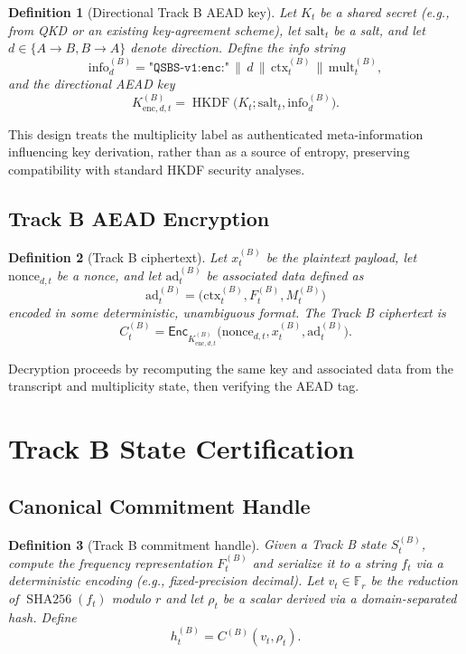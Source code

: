 \documentclass[11pt]{article}
\newtheorem{definition}{Definition}[section]
\newcommand{\F}{\mathbb{F}}
\newcommand{\Enc}{\mathsf{Enc}}
\DeclareMathOperator{\HKDF}{HKDF}
\DeclareMathOperator{\SHA}{SHA256}
\begin{document}
\begin{definition}[Directional Track B AEAD key]
Let \(K_t\) be a shared secret (e.g., from QKD or an existing key-agreement scheme),
let \(\mathrm{salt}_t\) be a salt, and let \(d \in \{A\to B, B\to A\}\) denote direction.
Define the info string
\[
  \mathrm{info}_d^{(B)} = \texttt{"QSBS-v1:enc:"} \, \| \, d \, \| \, \mathrm{ctx}_t^{(B)} \, \| \, \mathrm{mult}_t^{(B)},
\]
and the directional AEAD key
\[
  K_{\mathrm{enc},d,t}^{(B)} = \HKDF\bigl(K_t; \mathrm{salt}_t, \mathrm{info}_d^{(B)}\bigr).
\]
\end{definition}

This design treats the multiplicity label as authenticated meta-information influencing key derivation, rather than as a source of entropy, preserving compatibility with standard HKDF security analyses.

\subsection{Track B AEAD Encryption}

\begin{definition}[Track B ciphertext]
Let \(x_t^{(B)}\) be the plaintext payload, let \(\mathrm{nonce}_{d,t}\) be a nonce,
and let \(\mathrm{ad}_t^{(B)}\) be associated data defined as
\[
  \mathrm{ad}_t^{(B)} = \bigl(\mathrm{ctx}_t^{(B)}, F_t^{(B)}, M_t^{(B)}\bigr)
\]
encoded in some deterministic, unambiguous format.
The Track B ciphertext is
\[
  C_t^{(B)} = \Enc_{K_{\mathrm{enc},d,t}^{(B)}}\bigl(\mathrm{nonce}_{d,t}, x_t^{(B)}, \mathrm{ad}_t^{(B)}\bigr).
\]
\end{definition}

Decryption proceeds by recomputing the same key and associated data from the transcript and multiplicity state, then verifying the AEAD tag.

\section{Track B State Certification}

\subsection{Canonical Commitment Handle}

\begin{definition}[Track B commitment handle]
Given a Track B state \(S_t^{(B)}\), compute the frequency representation \(F_t^{(B)}\)
and serialize it to a string \(f_t\) via a deterministic encoding (e.g., fixed-precision decimal).
Let \(v_t \in \F_r\) be the reduction of \(\SHA(f_t)\) modulo \(r\) and let \(\rho_t\) be a scalar derived via a domain-separated hash.
Define
\[
  h_t^{(B)} = C^{(B)}(v_t, \rho_t).
\]
\end{definition}
\end{document}
